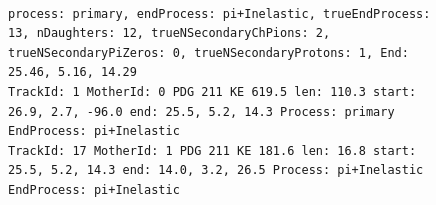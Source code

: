 \documentclass[letterpaper,12pt]{article}
\begin{document}
\begin{figure}[!hbtp]
  \begin{center}
\\
\begin{lstlisting}
process: primary, endProcess: pi+Inelastic, trueEndProcess: 13, nDaughters: 12, trueNSecondaryChPions: 2, trueNSecondaryPiZeros: 0, trueNSecondaryProtons: 1, End: 25.46, 5.16, 14.29
TrackId: 1 MotherId: 0 PDG 211 KE 619.5 len: 110.3 start: 26.9, 2.7, -96.0 end: 25.5, 5.2, 14.3 Process: primary EndProcess: pi+Inelastic
TrackId: 17 MotherId: 1 PDG 211 KE 181.6 len: 16.8 start: 25.5, 5.2, 14.3 end: 14.0, 3.2, 26.5 Process: pi+Inelastic EndProcess: pi+Inelastic

\end{lstlisting}
\end{center}
\end{figure}
\end{document}
